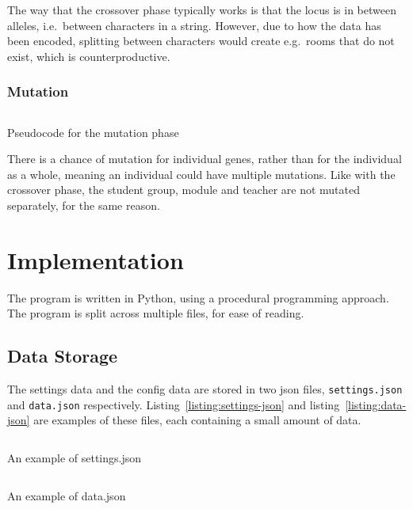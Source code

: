 \documentclass[a4paper, 12pt]{report}
\begin{document}
The way that the crossover phase typically works is that the locus is in between
alleles, i.e.\ between characters in a string. 
However, due to how the data has been encoded, splitting between characters 
would create e.g.\ rooms that do not exist, which is counterproductive. 

\newpage

\subsection{Mutation}

\begin{listing}[!ht]
	\inputminted[linenos, fontsize=\footnotesize]{text}{code/mutation.txt}
	\caption{Pseudocode for the mutation phase}
	\label{listing:mutation}
\end{listing}

There is a chance of mutation for individual genes, rather than for the 
individual as a whole, meaning an individual could have multiple mutations.
Like with the crossover phase, the student group, module and teacher are not 
mutated separately, for the same reason.

\chapter{Implementation}

The program is written in Python, using a procedural programming approach.
The program is split across multiple files, for ease of reading.

\section{Data Storage}

The settings data and the config data are stored in two json files, 
\verb|settings.json| and \verb|data.json| respectively.
Listing~\ref*{listing:settings-json} and listing~\ref*{listing:data-json} are
examples of these files, each containing a small amount of data.

\begin{listing}[!ht]
	\inputminted[linenos, fontsize=\footnotesize]{json}{code/settings_template.json}
	\caption{An example of settings.json}
	\label{listing:settings-json}
\end{listing}

\begin{listing}[!ht]
	\inputminted[linenos, fontsize=\footnotesize]{json}{code/data_template.json}
	\caption{An example of data.json}
	\label{listing:data-json}
\end{listing}
\end{document}
